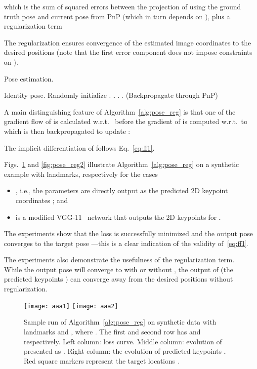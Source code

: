 \documentclass[10pt,twocolumn,letterpaper]{article}
\begin{document}
which is the sum of squared errors between the projection of  using the ground truth pose  and current pose  from PnP (which in turn depends on ), plus a regularization term

The regularization ensures convergence of the estimated image coordinates  to the desired positions (note that the first error component does not impose constraints on ).

\begin{algorithm}[t]
\caption{Pose estimation.}
\label{alg:pose_reg}
\begin{algorithmic}[1]
\STATE  Identity pose.
\STATE Randomly initialize 
\STATE .
\STATE .
\STATE .
\STATE . \quad (Backpropagate through PnP)   \ENDWHILE
\end{algorithmic}
\end{algorithm}


A main distinguishing feature of Algorithm~\ref{alg:pose_reg} is that one of the gradient flow of  is calculated w.r.t.~ before the gradient of  is computed w.r.t.~to  which is then backpropagated to update :

The implicit differentiation of  follows Eq.~\eqref{eq:ff1}.



Figs.~\ref{fig:pose_reg1} and \ref{fig:pose_reg2} illustrate Algorithm~\ref{alg:pose_reg} on a synthetic example with  landmarks, respectively for the cases
\begin{itemize}[leftmargin=1em,topsep=0.5em,parsep=0.5em]
\item , i.e., the parameters  are directly output as the predicted 2D keypoint coordinates ; and
\item  is a modified VGG-11~\cite{Simonyan2015very} network that outputs the 2D keypoints  for .
\end{itemize}
The experiments show that the loss  is successfully minimized and the output pose  converges to the target pose ---this is a clear indication of the validity of~\eqref{eq:ff1}.

The experiments also demonstrate the usefulness of the regularization term. While the output pose  will converge to  with or without , the output of  (the predicted keypoints ) can converge away from the desired positions  without regularization.






\begin{figure}[t]\centering
    \centering
    \texttt{[image: aaa1]}
    \texttt{[image: aaa2]}
    \caption{Sample run of Algorithm~\ref{alg:pose_reg} on synthetic data with  landmarks and , where . The first and second row has  and  respectively. Left column: loss curve. Middle column: evolution of  presented as . Right column: the evolution of predicted keypoints . Red square markers represent the target locations .}
    \label{fig:pose_reg1}
\end{figure}
\end{document}
